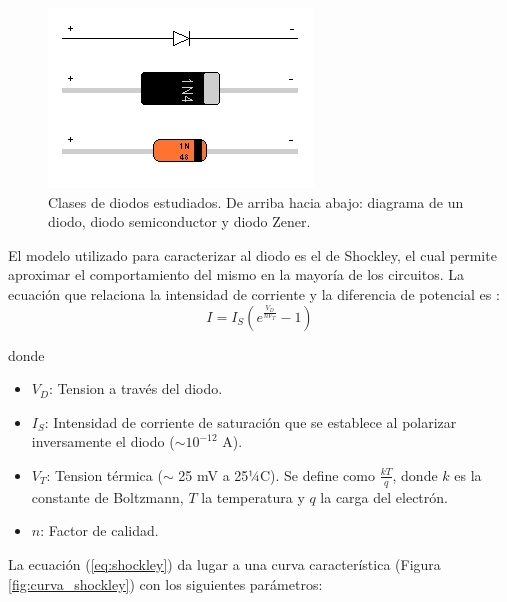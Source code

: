 \documentclass[twoside,twocolumn,a4paper]{article}
\begin{document}
\begin{figure}[h]
\captionsetup{justification=centering}
\includegraphics[width=\linewidth]{tipos_diodos.jpg}
\caption{Clases de diodos estudiados. De arriba hacia abajo: diagrama de un diodo, diodo semiconductor y diodo Zener.}
\label{fig:tipos_diodos}
\end{figure}

El modelo utilizado para caracterizar al diodo es el de Shockley, el cual permite aproximar el comportamiento del mismo en la mayor\'ia de los circuitos. La ecuaci\'on que relaciona la intensidad de corriente y la diferencia de potencial es \cite{eq:shockley}:
\begin{equation}
\label{eq:shockley}
I = I_{S}(e^\frac{V_{D}}{nV_{T}} - 1)
\end{equation}

donde

\begin{itemize}
\item 
$V_{D}$: Tension a trav\'es del diodo. 
\item 
$I_{S}$: Intensidad de corriente de saturaci\'on que se establece al polarizar inversamente el diodo ($\sim 10^{-12}$ A).
\item
$V_{T}$: Tension t\'ermica ($\sim$ 25 mV a 25¼C). Se define como $\frac{kT}{q}$, donde $k$ es la constante de Boltzmann, $T$ la temperatura y $q$ la carga del electr\'on.
\item
$n$: Factor de calidad.
\end{itemize}

La ecuaci\'on (\ref{eq:shockley}) da lugar a una curva caracter\'istica (Figura \ref{fig:curva_shockley}) con los siguientes par\'ametros:
\end{document}
